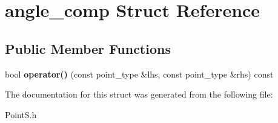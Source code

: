 \hypertarget{structangle__comp}{}\section{angle\+\_\+comp Struct Reference}
\label{structangle__comp}
\subsection*{Public Member Functions}
\begin{DoxyCompactItemize}
\item 
\mbox{\label{structangle__comp_accfd8fa867f63d48cdc1fa139e2639d0}} 
bool {\bfseries operator()} (const point\+\_\+type \&lhs, const point\+\_\+type \&rhs) const
\end{DoxyCompactItemize}


The documentation for this struct was generated from the following file\+:\begin{DoxyCompactItemize}
\item 
Point\+S.\+h\end{DoxyCompactItemize}

